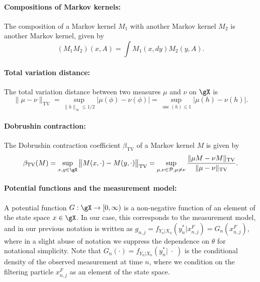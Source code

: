 \paragraph{Compositions of Markov kernels:} The composition of a Markov kernel $M_1$ with another Markov kernel $M_2$ is another Markov kernel, given by 
\begin{equation}
 (M_1M_2)(x, A) = \int M_1(x, dy) M_2(y, A).
\end{equation}

\paragraph{Total variation distance:} The total variation distance between two measures $\mu$ and $\nu$ on $\gX$ is
\begin{equation}
\|\mu-\nu\|_{\mathrm{TV}}=\sup _{\|h\|_{\infty} \leq 1 / 2}|\mu(\phi)-\nu(\phi)|=\sup _{\operatorname{osc}(h) \leq 1}|\mu(h)-\nu(h)|.    
\end{equation}

\paragraph{Dobrushin contraction:} The Dobrushin contraction coefficient $\beta_{\text{TV}}$ of a Markov kernel $M$ is given by
\begin{equation}
\beta_{\mathrm{TV}}(M)=\sup _{x, y \in \gX}\big\|M(x, \cdot)-M(y, \cdot)\big\|_{\mathrm{TV}}=\sup _{\mu, \nu \in \mathcal{P}, \mu \neq \nu} \frac{\|\mu M-\nu M\|_{\mathrm{TV}}}{\|\mu-\nu\|_{\mathrm{TV}}}.    
\end{equation}

\paragraph{Potential functions and the measurement model:} A potential function $G : \gX \to [0,\infty)$ is a non-negative function of an element of the state space $x \in \gX$. 
In our case, this corresponds to the measurement model, and in our previous notation is written as $g_{n,j} = f_{Y_n|X_n}(y_n^*|x_{n,j}^F) = G_n(x_{n,j}^F)$, where in a slight abuse of notation we suppress the dependence on $\theta$ for notational simplicity. 
Note that $G_n(\cdot) = f_{Y_n|X_n}(y_n^*|\;\cdot\;)$ is the conditional density of the observed measurement at time $n$, where we condition on the filtering particle $x_{n,j}^F$ as an element of the state space. 

